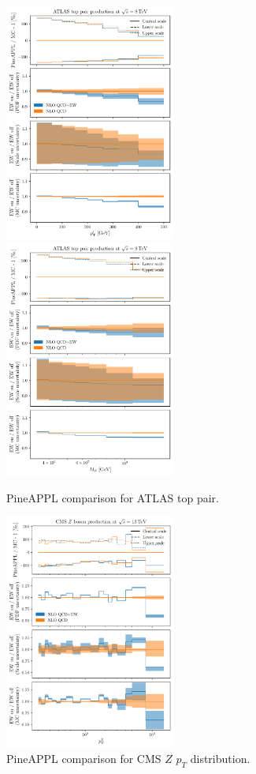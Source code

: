 \begin{figure}
    \centering
    \includegraphics[width=0.5\textwidth]{figures/pineappl_ATLAS_TTB_DIFF_8TEV_LJ_TPT}%
    \includegraphics[width=0.5\textwidth]{figures/pineappl_ATLAS_TTB_DIFF_8TEV_LJ_TTM}
    \caption{PineAPPL comparison for ATLAS top pair.}
    \label{fig:cmsdy2d11_bins56}
\end{figure}

\begin{figure}
    \centering
    \includegraphics[width=0.5\textwidth]{figures/pineappl_CMS_Z_13_TEV}
    \caption{PineAPPL comparison for CMS $Z$ $p_T$ distribution.}
    \label{fig:cmsdy2d11_bins56}
\end{figure}

